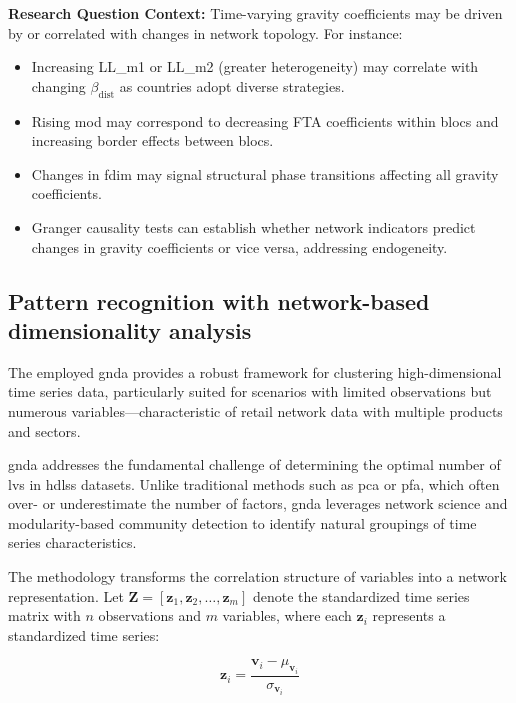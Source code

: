 \documentclass[preprint, 3p,
authoryear]{elsarticle} %
\begin{document}
\textbf{Research Question Context:} Time-varying gravity coefficients
may be driven by or correlated with changes in network topology. For
instance:

\begin{itemize}
    \item Increasing LL\_m1 or LL\_m2 (greater heterogeneity) may correlate with changing $\beta_{\text{dist}}$ as countries adopt diverse strategies.
    \item Rising \gls{mod} may correspond to decreasing FTA coefficients within blocs and increasing border effects between blocs.
    \item Changes in \gls{fdim} may signal structural phase transitions affecting all gravity coefficients.
    \item Granger causality tests can establish whether network indicators predict changes in gravity coefficients or vice versa, addressing endogeneity.
\end{itemize}

\subsection{Pattern recognition with network-based dimensionality
analysis}\label{sec:gnda}

The employed \gls{gnda} \citep{kosztyan2024generalized} provides a
robust framework for clustering high-dimensional time series data,
particularly suited for scenarios with limited observations but numerous
variables---characteristic of retail network data with multiple products
and sectors.

\gls{gnda} addresses the fundamental challenge of determining the
optimal number of \glspl{lv} in \gls{hdlss} datasets. Unlike traditional
methods such as \gls{pca} or \gls{pfa}, which often over- or
underestimate the number of factors, \gls{gnda} leverages network
science and modularity-based community detection to identify natural
groupings of time series characteristics.

The methodology transforms the correlation structure of variables into a
network representation. Let
\(\mathbf{Z} = [\mathbf{z}_1, \mathbf{z}_2, \ldots, \mathbf{z}_m]\)
denote the standardized time series matrix with \(n\) observations and
\(m\) variables, where each \(\mathbf{z}_i\) represents a standardized
time series:

\begin{equation}
\mathbf{z}_i = \frac{\mathbf{v}_i - \mu_{\mathbf{v}_i}}{\sigma_{\mathbf{v}_i}}
\end{equation}
\end{document}
